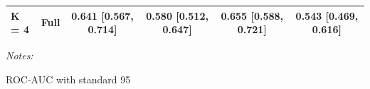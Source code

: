 \begin{table}
\begin{threeparttable}
\begin{tabular}[t]{llcccc}
\multirow[t]{-2}{*}[\normalbaselineskip]{\raggedright\arraybackslash K = 4} & Full & 0.641 [0.567, 0.714] & 0.580 [0.512, 0.647] & 0.655 [0.588, 0.721] & 0.543 [0.469, 0.616]\\
\bottomrule
\end{tabular}
\begin{tablenotes}
\item \textit{Notes: } 
\item ROC-AUC with standard 95%
\end{tablenotes}
\end{threeparttable}
\end{table}
